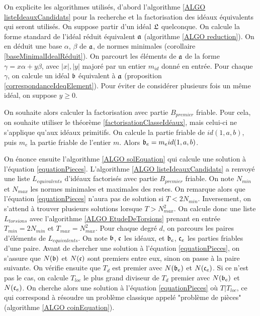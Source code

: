 On explicite les algorithmes utilisés, d'abord l'algorithme \ref{ALGO listeIdeauxCandidats} pour la recherche et la factorisation des idéaux équivalents qui seront utilisés. On suppose partir d'un idéal $\mathfrak{L}$ quelconque. On calcule la forme standard de l'idéal réduit équivalent $\mathfrak{a}$ (algorithme \ref{ALGO reduction}). On en déduit une base $\alpha$, $\beta$ de $\mathfrak{a}$, de normes minimales (corollaire \ref{baseMinimalIdealRéduit}). On parcourt les éléments de $\mathfrak{a}$ de la forme $\gamma = x\alpha + y\beta$, avec $|x|,|y|$ majoré par un entier $m_{id}$ donné en entrée. Pour chaque $\gamma$, on calcule un idéal $\mathfrak{b}$ équivalent à $\mathfrak{a}$ (proposition \ref{correspondanceIdeqElement}). Pour éviter de considérer plusieurs fois un même idéal, on suppose $y\geq0$. 

On souhaite alors calculer la factorisation avec partie $B_{premier}$ friable. Pour cela, on souhaite utiliser le théorème \ref{factorisationClasseIdéaux}, mais celui-ci ne s'applique qu'aux idéaux primitifs. On calcule la partie friable de $id(1,a,b)$, puis $m_e$ la partie friable de l'entier $m$. Alors $\mathfrak{b}_e = m_eid(1,a,b)$.
 
On énonce ensuite l'algorithme \ref{ALGO solEquation} qui calcule une solution à l'équation \eqref{equationPieces}. L'algorithme \ref{ALGO listeIdeauxCandidats} a renvoyé une liste $L_{equivalents}$ d'idéaux factorisés avec partie $B_{premier}$ friable. On note $N_{min}$ et $N_{max}$ les normes minimales et maximales des restes. On remarque alors que l'équation \eqref{equationPieces} n'aura pas de solution si $T<2N_{min}$. Inversement, on s'attend à trouver plusieurs solutions lorsque $T > N_{max}^2$. On calcule donc une liste $L_{torsions}$ avec l'algorithme \ref{ALGO EtudeDeTorsions} prenant en entrée $T_{min} = 2N_{min}$ et $T_{max} = N_{max}^2$. Pour chaque degré $d$, on parcours les paires d'éléments de $L_{equivalents}$. On note $\mathfrak{b}$, $\mathfrak{c}$ les idéaux, et $\mathfrak{b}_e$, $\mathfrak{c}_e$ les parties friables d'une paire. Avant de chercher une solution à l'équation \eqref{equationPieces}, on s'assure que $N(\mathfrak{b})$ et $N(\mathfrak{c})$ sont premiers entre eux, sinon on passe à la paire suivante. On vérifie ensuite que $T_d$ est premier avec $N(\mathfrak{b}_e)$ et $N(\mathfrak{c}_e)$. Si ce n'est pas le cas, on calcule $T_{loc}$ le plus grand diviseur de $T_d$ premier avec $N(\mathfrak{b}_e)$ et $N(\mathfrak{c}_e)$. On cherche alors une solution à l'équation \eqref{equationPieces} où $T|T_{loc}$, ce qui correspond à résoudre un problème classique appelé "problème de pièces" (algorithme \ref{ALGO coinEquation}). 

